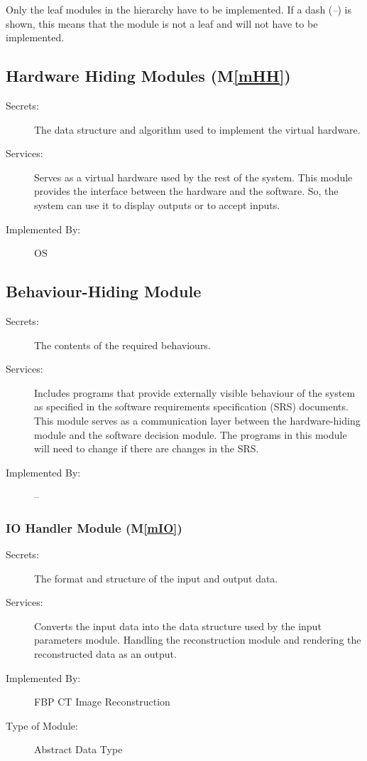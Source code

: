 \documentclass[12pt, titlepage]{article}
\newcommand{\mref}[1]{M\ref{#1}}
\begin{document}
Only the leaf modules in the hierarchy have to be implemented. If a dash
(\emph{--}) is shown, this means that the module is not a leaf and will not have
to be implemented.

\subsection{Hardware Hiding Modules (\mref{mHH})}

\begin{description}
\item[Secrets:]The data structure and algorithm used to implement the virtual
  hardware.
\item[Services:]Serves as a virtual hardware used by the rest of the
  system. This module provides the interface between the hardware and the
  software. So, the system can use it to display outputs or to accept inputs.
\item[Implemented By:] OS
\end{description}

\subsection{Behaviour-Hiding Module}

\begin{description}
\item[Secrets:]The contents of the required behaviours.
\item[Services:]Includes programs that provide externally visible behaviour of
  the system as specified in the software requirements specification (SRS)
  documents. This module serves as a communication layer between the
  hardware-hiding module and the software decision module. The programs in this
  module will need to change if there are changes in the SRS.
\item[Implemented By:] --
\end{description}

\subsubsection{IO Handler Module (\mref{mIO})}

\begin{description}
\item[Secrets:]The format and structure of the input and output data.
\item[Services:]Converts the input data into the data structure used by the
  input parameters module. 
  Handling the reconstruction module and rendering the reconstructed data as an output.
\item[Implemented By:] FBP CT Image Reconstruction
\item[Type of Module:] Abstract Data Type
\end{description}
\end{document}
